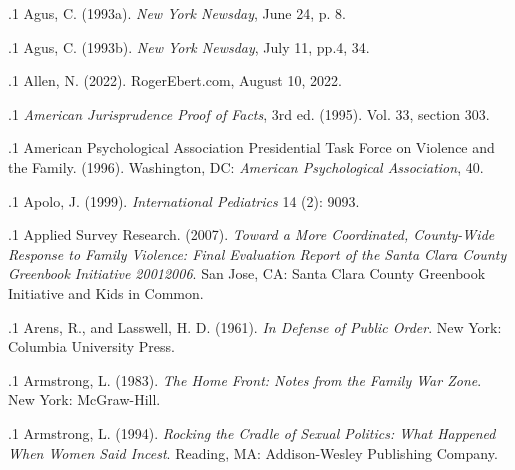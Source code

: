\documentclass[11pt, twoside]{article}
\begin{document}
\thispagestyle{empty}

{\fontsize{13}{19}\selectfont


\hspace{-3.8em}\begin{minipage}{1.1\textwidth}
\begin{flushright}
{\fontsize{14}{22}\selectfont
\textbf{%
}
}
\end{flushright}
\end{minipage}


\vspace{6em}




\p.1{%
Agus, C. (1993a).  \textit{New York Newsday}, June 24, p. 8.
}%

\p.1{%
Agus, C. (1993b).  \textit{New York Newsday}, July 11,
pp.\@ 4, 34.
}%

\p.1{%
Allen, N. (2022).  RogerEbert.com, August
10, 2022.
}%

\p.1{%
\textit{American Jurisprudence Proof of Facts}, 3rd ed. (1995). Vol. 33, section 303.
}%

\p.1{%
American Psychological Association Presidential Task Force on Violence and the
Family. (1996).  Washington, DC:
\textit{American Psychological Association}, 40.
}%

\p.1{%
Apolo, J. (1999).  \textit{International Pediatrics} 14 (2): 90\ndash{}93.
}%

\p.1{%
Applied Survey Research. (2007). \textit{Toward a More Coordinated, County-Wide Response
to Family Violence: Final Evaluation Report of the Santa Clara County Greenbook
Initiative 2001\ndash{}2006}. San Jose, CA: Santa Clara County Greenbook Initiative and
Kids in Common.
}%

\p.1{%
Arens, R., and Lasswell, H. D. (1961). \textit{In Defense of Public Order}. New York: Columbia
University Press.
}%

\p.1{%
Armstrong, L. (1983). \textit{The Home Front: Notes from
the Family War Zone}. New York: McGraw-Hill.
}%

\p.1{%
Armstrong, L. (1994). \textit{Rocking the Cradle of Sexual Politics: What Happened When
Women Said Incest}. Reading, MA: Addison-Wesley Publishing Company.
}%

}
\end{document}
